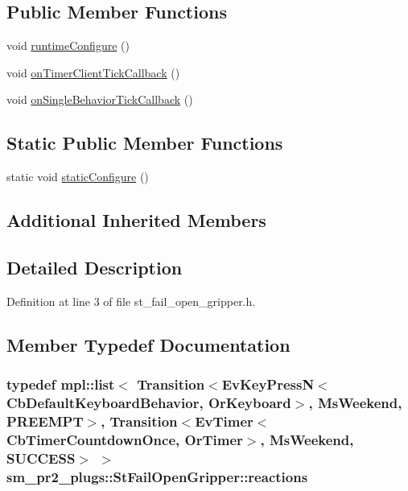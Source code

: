 \subsection*{Public Member Functions}
\begin{DoxyCompactItemize}
\item 
void \hyperlink{structsm__pr2__plugs_1_1StFailOpenGripper_a9972024358d52891ff6ff0282f1abfba}{runtime\+Configure} ()
\item 
void \hyperlink{structsm__pr2__plugs_1_1StFailOpenGripper_a61f887a4b8a6884466df6bdf96af3936}{on\+Timer\+Client\+Tick\+Callback} ()
\item 
void \hyperlink{structsm__pr2__plugs_1_1StFailOpenGripper_a93912d044e4fe53795fc07174ae3f830}{on\+Single\+Behavior\+Tick\+Callback} ()
\end{DoxyCompactItemize}
\subsection*{Static Public Member Functions}
\begin{DoxyCompactItemize}
\item 
static void \hyperlink{structsm__pr2__plugs_1_1StFailOpenGripper_aec94e3e8bea31f8eb3f37c11e57fd5d1}{static\+Configure} ()
\end{DoxyCompactItemize}
\subsection*{Additional Inherited Members}


\subsection{Detailed Description}


Definition at line 3 of file st\+\_\+fail\+\_\+open\+\_\+gripper.\+h.



\subsection{Member Typedef Documentation}
\subsubsection[{\texorpdfstring{reactions}{reactions}}]{\setlength{\rightskip}{0pt plus 5cm}typedef mpl\+::list$<$ Transition$<$Ev\+Key\+PressN$<$Cb\+Default\+Keyboard\+Behavior, {\bf Or\+Keyboard}$>$, {\bf Ms\+Weekend}, {\bf P\+R\+E\+E\+M\+PT}$>$, Transition$<$Ev\+Timer$<$Cb\+Timer\+Countdown\+Once, {\bf Or\+Timer}$>$, {\bf Ms\+Weekend}, {\bf S\+U\+C\+C\+E\+SS}$>$ $>$ {\bf sm\+\_\+pr2\+\_\+plugs\+::\+St\+Fail\+Open\+Gripper\+::reactions}}\hypertarget{structsm__pr2__plugs_1_1StFailOpenGripper_a9779d3f7c0bb4155fdab72e2cb0efe0d}{}\label{structsm__pr2__plugs_1_1StFailOpenGripper_a9779d3f7c0bb4155fdab72e2cb0efe0d}



